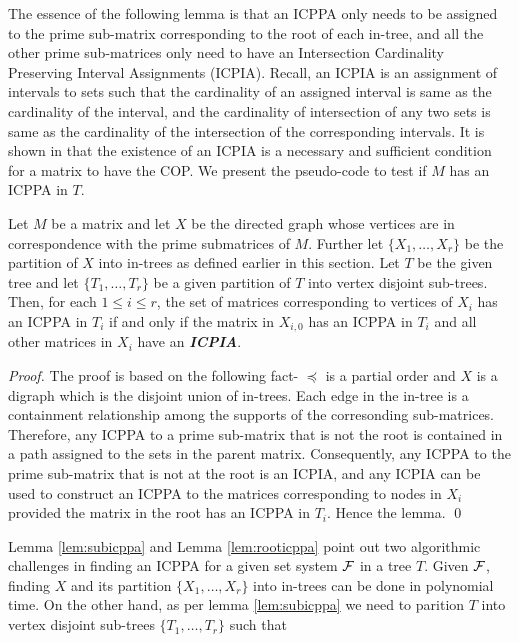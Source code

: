 \documentclass{llncs}
\def\cF{{\cal F}}
\begin{document}
 The essence of the following lemma is that an ICPPA only needs to be
 assigned to the prime sub-matrix corresponding to the root of each
 in-tree, and all the other prime sub-matrices only need to have an
 Intersection Cardinality Preserving Interval Assignments (ICPIA).
 Recall, an ICPIA is an assignment of intervals to sets such that the
 cardinality of an assigned interval is same as the cardinality of the
 interval, and the cardinality of intersection of any two sets is same
 as the cardinality of the intersection of the corresponding
 intervals.  It is shown in \cite{nsnrs09} that the existence of an
 ICPIA is a necessary and sufficient condition for a matrix to have
 the COP.  
We present the pseudo-code to test if $M$ has an ICPPA in $T$. 
\begin{lemma} \label{lem:rooticppa}
Let $M$ be a matrix and let $X$ be the directed graph whose vertices
are in correspondence with the prime submatrices of $M$.  Further let
$\{X_1,\ldots,X_r\}$ be the partition of $X$ into in-trees as defined
earlier in this section. 
Let $T$ be the given tree and let $\{T_1, \ldots, T_r\}$ be a given
partition of $T$ into vertex disjoint sub-trees. 
Then, for each $1 \leq i \leq r$, the set of matrices corresponding to
vertices of $X_i$ has an ICPPA in $T_i$ if and only if the matrix in
$X_{i,0}$ has an ICPPA in $T_i$ and all other matrices in $X_i$ have
an {\bf {\em ICPIA}}. 
\end{lemma}
\begin{proof}
The proof is based on the following fact- $\preccurlyeq$ is a partial
order and $X$ is a digraph which is the disjoint 
union of in-trees.  Each edge in the in-tree is a containment
relationship among the supports of the corresonding
sub-matrices. Therefore, any ICPPA to a prime sub-matrix that is not
the root is contained in a path assigned to the sets in the parent
matrix.  Consequently, any ICPPA to the prime sub-matrix that is not
at the root is an ICPIA, and any ICPIA can be used to construct an
ICPPA to the matrices corresponding to nodes in $X_i$ provided the
matrix in the root has an ICPPA in $T_i$.   Hence the lemma. \qed
\end{proof}
Lemma \ref{lem:subicppa} and Lemma \ref{lem:rooticppa} point out two
algorithmic challenges in finding an ICPPA for a given set system
$\cF$ in a tree $T$.  Given $\cF$, finding $X$ and its partition
$\{X_1,\ldots,X_r\}$ into in-trees can be done in polynomial time.  On
the other hand, as per lemma \ref{lem:subicppa} we need to parition
$T$ into vertex disjoint sub-trees $\{T_1, \ldots, T_r\}$ such that
\end{document}
